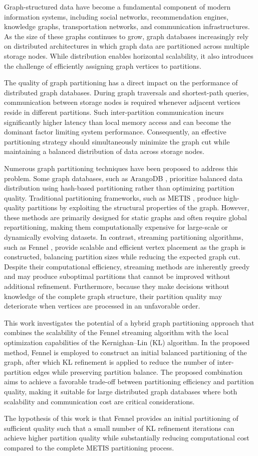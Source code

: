 Graph-structured data have become a fundamental component of modern information systems, including social networks, recommendation engines, knowledge graphs, transportation networks, and communication infrastructures. As the size of these graphs continues to grow, graph databases increasingly rely on distributed architectures in which graph data are partitioned across multiple storage nodes. While distribution enables horizontal scalability, it also introduces the challenge of efficiently assigning graph vertices to partitions.

The quality of graph partitioning has a direct impact on the performance of distributed graph databases. During graph traversals and shortest-path queries, communication between storage nodes is required whenever adjacent vertices reside in different partitions. Such inter-partition communication incurs significantly higher latency than local memory access and can become the dominant factor limiting system performance. Consequently, an effective partitioning strategy should simultaneously minimize the graph cut while maintaining a balanced distribution of data across storage nodes.

Numerous graph partitioning techniques have been proposed to address this problem. Some graph databases, such as ArangoDB \cite{arangodb_github}, prioritize balanced data distribution using hash-based partitioning rather than optimizing partition quality. Traditional partitioning frameworks, such as METIS \cite{MetisOG}, produce high-quality partitions by exploiting the structural properties of the graph. However, these methods are primarily designed for static graphs and often require global repartitioning, making them computationally expensive for large-scale or dynamically evolving datasets. In contrast, streaming partitioning algorithms, such as Fennel \cite{Fennel}, provide scalable and efficient vertex placement as the graph is constructed, balancing partition sizes while reducing the expected graph cut. Despite their computational efficiency, streaming methods are inherently greedy and may produce suboptimal partitions that cannot be improved without additional refinement. Furthermore, because they make decisions without knowledge of the complete graph structure, their partition quality may deteriorate when vertices are processed in an unfavorable order.

This work investigates the potential of a hybrid graph partitioning approach that combines the scalability of the Fennel streaming algorithm with the local optimization capabilities of the Kernighan--Lin (KL) algorithm. In the proposed method, Fennel is employed to construct an initial balanced partitioning of the graph, after which KL refinement is applied to reduce the number of inter-partition edges while preserving partition balance. The proposed combination aims to achieve a favorable trade-off between partitioning efficiency and partition quality, making it suitable for large distributed graph databases where both scalability and communication cost are critical considerations.

The hypothesis of this work is that Fennel provides an initial partitioning of sufficient quality such that a small number of KL refinement iterations can achieve higher partition quality while substantially reducing computational cost compared to the complete METIS partitioning process.

